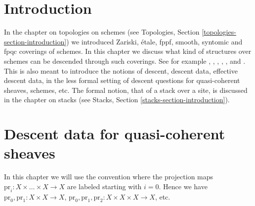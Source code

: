 \section{Introduction}
\label{descent-section-introduction}
In the chapter on topologies on schemes
(see Topologies, Section \ref{topologies-section-introduction}) we introduced
Zariski, \'etale, fppf, smooth, syntomic and fpqc coverings of schemes.
In this chapter we discuss what kind of structures over schemes
can be descended through such coverings.
See for example \cite{Gr-I}, \cite{Gr-II}, \cite{Gr-III},
\cite{Gr-IV}, \cite{Gr-V}, and \cite{Gr-VI}.
This is also meant to introduce the notions of
descent, descent data, effective descent data, in the less formal
setting of descent questions for quasi-coherent sheaves, schemes, etc.
The formal notion, that of a stack over a site, is discussed in
the chapter on stacks (see Stacks, Section \ref{stacks-section-introduction}).

\section{Descent data for quasi-coherent sheaves}
\label{descent-section-equivalence}
In this chapter we will use the convention where
the projection maps $\text{pr}_i : X \times \ldots \times X \to X$
are labeled starting with $i = 0$. Hence we have
$\text{pr}_0, \text{pr}_1 : X \times X  \to X$,
$\text{pr}_0, \text{pr}_1, \text{pr}_2 : X \times X \times X  \to X$,
etc.


